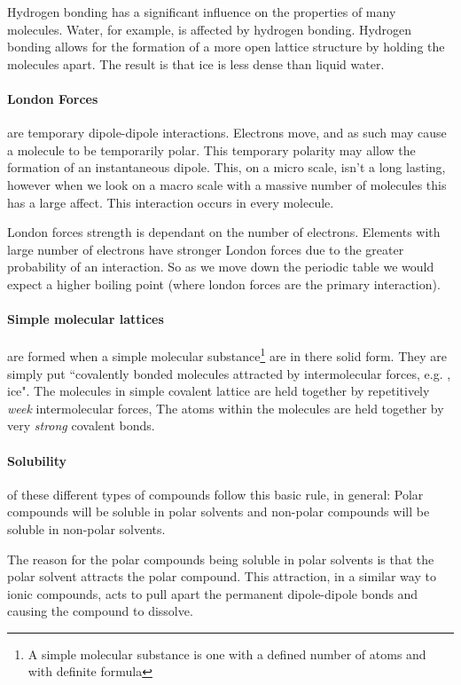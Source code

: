 \documentclass[11pt,a4paper]{memoir}
\begin{document}
	Hydrogen bonding has a significant influence on the properties of many molecules. Water, for example, is affected by hydrogen bonding. Hydrogen bonding allows for the formation of a more open lattice structure by holding the molecules apart. The result is that ice is less dense than liquid water.
	
	\paragraph{London Forces} are temporary dipole-dipole interactions. Electrons move, and as such may cause a molecule to be temporarily polar. This temporary polarity may allow the formation of an instantaneous dipole. This, on a micro scale, isn't a long lasting, however when we look on a macro scale with a massive number of molecules this has a large affect. This interaction occurs in every molecule.
	
	London forces strength is dependant on the number of electrons. Elements with large number of electrons have stronger London forces due to the greater probability of an interaction. So as we move down the periodic table we would expect a higher boiling point (where london forces are the primary interaction).
	
	\paragraph{Simple molecular lattices} are formed when a simple molecular substance\footnote{A simple molecular substance is one with a defined number of atoms and with definite formula} are in there solid form. They are simply put ``covalently bonded molecules attracted by intermolecular forces, e.g. , ice". The molecules in simple covalent lattice are held together by repetitively \textit{week} intermolecular forces, The atoms within the molecules are held together by very \textit{strong} covalent bonds.
	
	\paragraph{Solubility} of these different types of compounds follow this basic rule, in general: Polar compounds will be soluble in polar solvents and non-polar compounds will be soluble in non-polar solvents.
	
	The reason for the polar compounds being soluble in polar solvents is that the polar solvent attracts the polar compound. This attraction, in a similar way to ionic compounds, acts to pull apart the permanent dipole-dipole bonds and causing the compound to dissolve.
	
\end{document}
